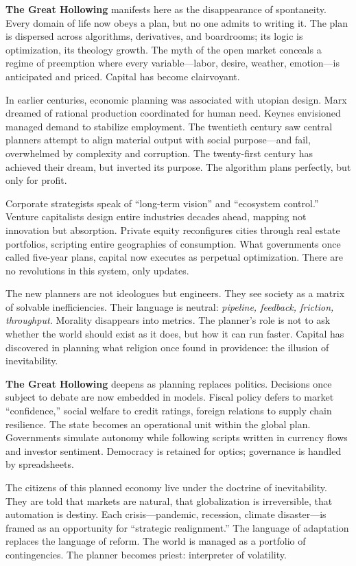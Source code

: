 \documentclass[11pt,twoside]{book}
\begin{document}
\textbf{The Great Hollowing} manifests here as the disappearance of spontaneity.  Every domain of life now obeys a plan, but no one admits to writing it.  The plan is dispersed across algorithms, derivatives, and boardrooms; its logic is optimization, its theology growth.  The myth of the open market conceals a regime of preemption where every variable—labor, desire, weather, emotion—is anticipated and priced.  Capital has become clairvoyant.

In earlier centuries, economic planning was associated with utopian design.  Marx dreamed of rational production coordinated for human need.  Keynes envisioned managed demand to stabilize employment.  The twentieth century saw central planners attempt to align material output with social purpose—and fail, overwhelmed by complexity and corruption.  The twenty-first century has achieved their dream, but inverted its purpose.  The algorithm plans perfectly, but only for profit.

Corporate strategists speak of “long-term vision” and “ecosystem control.”  Venture capitalists design entire industries decades ahead, mapping not innovation but absorption.  Private equity reconfigures cities through real estate portfolios, scripting entire geographies of consumption.  What governments once called five-year plans, capital now executes as perpetual optimization.  There are no revolutions in this system, only updates.

The new planners are not ideologues but engineers.  They see society as a matrix of solvable inefficiencies.  Their language is neutral: \emph{pipeline, feedback, friction, throughput.}  Morality disappears into metrics.  The planner’s role is not to ask whether the world should exist as it does, but how it can run faster.  Capital has discovered in planning what religion once found in providence: the illusion of inevitability.

\textbf{The Great Hollowing} deepens as planning replaces politics.  Decisions once subject to debate are now embedded in models.  Fiscal policy defers to market “confidence,” social welfare to credit ratings, foreign relations to supply chain resilience.  The state becomes an operational unit within the global plan.  Governments simulate autonomy while following scripts written in currency flows and investor sentiment.  Democracy is retained for optics; governance is handled by spreadsheets.

The citizens of this planned economy live under the doctrine of inevitability.  They are told that markets are natural, that globalization is irreversible, that automation is destiny.  Each crisis—pandemic, recession, climate disaster—is framed as an opportunity for “strategic realignment.”  The language of adaptation replaces the language of reform.  The world is managed as a portfolio of contingencies.  The planner becomes priest: interpreter of volatility.
\end{document}
